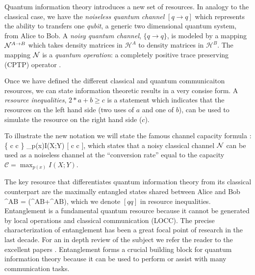 \documentclass[aps,11pt,twoside,letterpaper]{article}
\def\cH{\mathcal{H}}
\begin{document}
			Quantum information theory introduces a new set of resources. 
			In analogy to the classical case, we have the \emph{noiseless quantum channel} $[q \to q]$ which 
			represents the ability to transfers one \emph{qubit}, a generic two dimensional quantum system, 
			from Alice to Bob.
			A \emph{noisy quantum channel}, $\{q \to q\}$, is modeled by a mapping ${\cal N}^{A \to B}$ 
			which takes density matrices in $\cH^A$ to density matrices in $\cH^B$.
			The mapping ${\cal N}$ is a \emph{quantum operation}: a completely positive trace preserving (CPTP) 
			operator \cite{NC04}.
		
            Once we have defined the different classical and quantum communicaiton resources,
            we can state information theoretic results in a very consise form.
            A \emph{resource inequalities}, $2*a+b \geq c$ is a statement which indicates that 
            the resources on the left hand side (two uses of $a$ and one of $b$),
            can be used to simulate the resource on the right hand side ($c$).

            To illustrate the new notation we will state the famous channel
            capacity formula \cite{S48}:
            \be
                \{ c \to c \} \geq \max_{p(x)}I(X;Y) [  c \to c ],
            \ee
            which states that a noisy classical channel ${\cal N}$ can be used as a noiseless channel
            at the ``conversion rate'' equal to the capacity $\mathcal{C} = \max_{p(x)}I(X;Y)$.

			The key resource that differentiates quantum information theory 
            from its classical counterpart are the maximally entangled states shared between 
			Alice and Bob 
			\be
				\ket{\Phi}^{AB} = (^{AB}+^{AB}),
			\ee
			which we denote $[qq]$ in resource inequalities.  
			Entanglement is a fundamental quantum resource because it cannot be generated by local operations and
			classical communication (LOCC). 
			The precise characterization of entanglement has been a great focal point of research in the last decade.
			For an in depth review of the subject we refer the reader to the excellent papers \cite{VP98, HHHH}.
			Entanglement forms a crucial building block for quantum information theory because it can be used 
			to perform or assist with many communication tasks.
\end{document}
